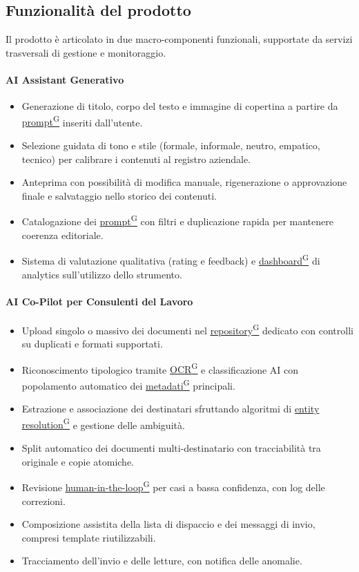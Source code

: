 ﻿\documentclass[a4paper,12pt]{article}
\providecommand{\glslink}[2]{\href{https://alittlebyte-19.github.io/Documentazione/glossario.html\#gls-#1}{\underline{#2}\textsuperscript{\scriptsize G}}}
\begin{document}
\subsection{Funzionalità del prodotto}

Il prodotto è articolato in due macro-componenti funzionali, supportate da servizi trasversali di gestione e monitoraggio.

\paragraph{AI Assistant Generativo}
\begin{itemize}
    \item Generazione di titolo, corpo del testo e immagine di copertina a partire da \glslink{prompt}{prompt} inseriti dall'utente.
    \item Selezione guidata di tono e stile (formale, informale, neutro, empatico, tecnico) per calibrare i contenuti al registro aziendale.
    \item Anteprima con possibilità di modifica manuale, rigenerazione o approvazione finale e salvataggio nello storico dei contenuti.
    \item Catalogazione dei \glslink{prompt}{prompt} con filtri e duplicazione rapida per mantenere coerenza editoriale.
    \item Sistema di valutazione qualitativa (rating e feedback) e \glslink{dashboard}{dashboard} di analytics sull'utilizzo dello strumento.
\end{itemize}

\paragraph{AI Co-Pilot per Consulenti del Lavoro}
\begin{itemize}
    \item Upload singolo o massivo dei documenti nel \glslink{repository}{repository} dedicato con controlli su duplicati e formati supportati.
    \item Riconoscimento tipologico tramite \glslink{ocr-riconoscimento-ottico-dei-caratteri}{OCR} e classificazione AI con popolamento automatico dei \glslink{metadati}{metadati} principali.
    \item Estrazione e associazione dei destinatari sfruttando algoritmi di \glslink{entity-resolution}{entity resolution} e gestione delle ambiguità.
    \item Split automatico dei documenti multi-destinatario con tracciabilità tra originale e copie atomiche.
    \item Revisione \glslink{human-in-the-loop}{human-in-the-loop} per casi a bassa confidenza, con log delle correzioni.
    \item Composizione assistita della lista di dispaccio e dei messaggi di invio, compresi template riutilizzabili.
    \item Tracciamento dell'invio e delle letture, con notifica delle anomalie.
\end{itemize}
\end{document}
